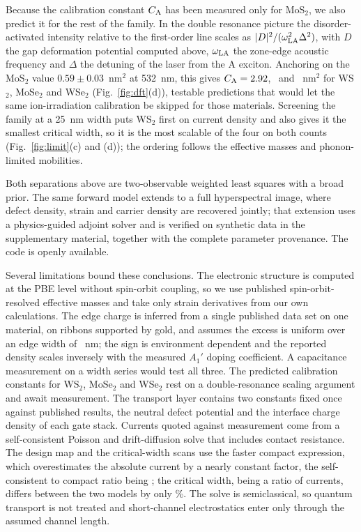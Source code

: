 \documentclass[aip,apl,amsmath,amssymb,reprint,longbibliography]{revtex4-1}
\begin{document}
Because the calibration constant $C_{\rm A}$ has been measured only for
MoS$_2$, we also predict it for the rest of the family. In the double
resonance picture the disorder-activated intensity relative to the first-order
line scales as $|D|^2/(\omega_{\rm LA}^2\Delta^2)$, with $D$ the gap
deformation potential computed above, $\omega_{\rm LA}$ the zone-edge acoustic
frequency and $\Delta$ the detuning of the laser from the A exciton. Anchoring
on the MoS$_2$ value $0.59\pm0.03$~nm$^2$ at 532~nm,\cite{Mignuzzi2015} this
gives $C_{\rm A}=2.92$, \CAMoSeTwo\ and \CAWSeTwo~nm$^2$ for WS$_2$,
MoSe$_2$ and WSe$_2$ (Fig.~\ref{fig:dft}(d)), testable predictions that would
let the same ion-irradiation calibration be skipped for those materials.
Screening the family at a 25~nm width puts WS$_2$ first on current density and
also gives it the smallest critical width, so it is the most scalable of the
four on both counts (Fig.~\ref{fig:limit}(c) and (d)); the ordering follows the
effective masses and phonon-limited mobilities.\cite{Jin2014,Ha2024}

Both separations above are two-observable weighted least squares with a broad
prior. The same forward model extends to a full hyperspectral image, where
defect density, strain and carrier density are recovered jointly; that
extension uses a physics-guided adjoint solver and is verified on synthetic
data in the supplementary material, together with the complete parameter
provenance. The code is openly available.

Several limitations bound these conclusions. The electronic structure is
computed at the PBE level without spin-orbit coupling, so we use published
spin-orbit-resolved effective masses\cite{Jin2014,Kormanyos2015} and take only
strain derivatives from our own calculations. The edge charge is inferred from
a single published data set on one material, on ribbons supported by gold, and
assumes the excess is uniform over an edge width of \Wedge~nm; the sign is
environment dependent and the reported density scales inversely with the
measured $A_1'$ doping coefficient. A capacitance measurement on a width
series would test all three.
The predicted calibration constants for WS$_2$, MoSe$_2$ and WSe$_2$ rest on a
double-resonance scaling argument and await measurement. The transport layer
contains two constants fixed once against published results, the neutral
defect potential and the interface charge density of each gate stack. Currents
quoted against measurement come from a self-consistent Poisson and
drift-diffusion solve that includes contact resistance. The design map and the
critical-width scans use the faster compact expression, which overestimates the
absolute current by a nearly constant factor, the self-consistent to compact
ratio being \ScRatio; the critical width, being a ratio of currents, differs
between the two models by only \WcModelDiff\%. The solve is semiclassical, so quantum transport is not
treated and short-channel electrostatics enter only through the assumed channel
length.
\end{document}
